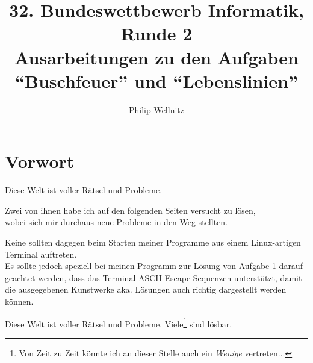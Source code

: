 \documentclass[a4paper,12pt,table]{article}
\title{32. Bundeswettbewerb Informatik, Runde 2\\ \small{Ausarbeitungen zu den Aufgaben \enquote{Buschfeuer} und \enquote{Lebenslinien} }}
\author{Philip Wellnitz}
\date{}
\begin{document}
\thispagestyle{empty}
\maketitle
\newpage
\section*{Vorwort}

Diese Welt ist voller Rätsel und Probleme.

Zwei von ihnen habe ich auf den folgenden Seiten versucht zu lösen,\\ wobei sich mir durchaus neue Probleme in den Weg stellten.

Keine sollten dagegen beim Starten meiner Programme aus einem Linux-artigen Terminal auftreten. \\
Es sollte jedoch speziell bei meinen Programm zur Lösung von Aufgabe 1 darauf geachtet werden, dass das Terminal ASCII-Escape-Sequenzen unterstützt, damit die ausgegebenen Kunstwerke aka. Lösungen auch richtig dargestellt werden können.

Diese Welt ist voller Rätsel und Probleme. Viele\footnote{Von Zeit zu Zeit könnte ich an dieser Stelle auch ein \emph{Wenige} vertreten...} sind lösbar.


\tableofcontents
\newpage

\newpage

\newpage
\end{document}
